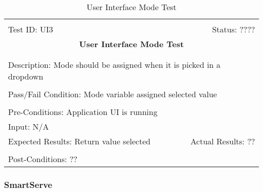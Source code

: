 \documentclass[11pt]{article}
\begin{document}
\begin{center}
\begin{table}[H]
\begin{tabular}{|l r|}\hline&\\[-2mm]
	Test ID: UI3	&Status: ???? \\[-3mm]
	\multicolumn{2}{|c|}{\textbf{\large{User Interface Mode Test}}}\\&\\\hline&\\[-3mm]
	\multicolumn{2}{|p{\textwidth}|}{Description: Mode should be assigned when it is picked in a dropdown}\\[1mm]\hline&\\[-3mm]
	\multicolumn{2}{|p{\textwidth}|}{Pass/Fail Condition: Mode variable assigned selected value}\\[1mm]\hline&\\[-3mm]
	\multicolumn{2}{|p{\textwidth}|}{Pre-Conditions: Application UI is running}\\[4mm]
	\multicolumn{2}{|p{\textwidth}|}{Input: N/A}\\[2mm]\hline
	\multicolumn{1}{|p{0.49\textwidth}}{Expected Results: Return value selected }	&\multicolumn{1}{|p{0.45\textwidth}|}{Actual Results: ??}\\\hline&\\[-3mm]
	\multicolumn{2}{|p{\textwidth}|}{Post-Conditions: ??}\\\hline
\end{tabular}
\caption{User Interface Mode Test}
\end{table}
\end{center}

\subsubsection{SmartServe}
\end{document}
